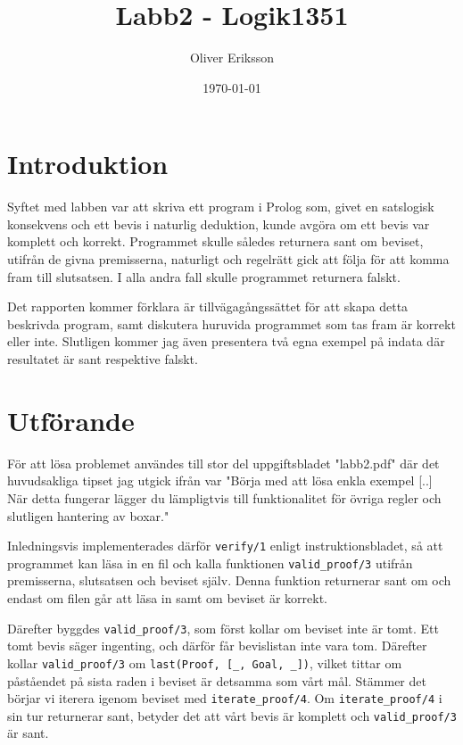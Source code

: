 \documentclass[a4paper]{article}
\title{Labb2 - Logik1351}
\author{Oliver Eriksson}
\date{\today}
\begin{document}
\maketitle
\newpage
\tableofcontents
\newpage

\section{Introduktion}
\label{sec:introduction}

Syftet med labben var att skriva ett program i Prolog som, givet en satslogisk konsekvens och ett bevis i naturlig deduktion, kunde avgöra om ett bevis var komplett och korrekt. Programmet skulle således returnera sant om beviset, utifrån de givna premisserna, naturligt och regelrätt gick att följa för att komma fram till slutsatsen. I alla andra fall skulle programmet returnera falskt.

Det rapporten kommer förklara är tillvägagångssättet för att skapa detta beskrivda program, samt diskutera huruvida programmet som tas fram är korrekt eller inte. Slutligen kommer jag även presentera två egna exempel på indata där resultatet är sant respektive falskt.

\section{Utförande}
För att lösa problemet användes till stor del uppgiftsbladet "labb2.pdf" där det huvudsakliga tipset jag utgick ifrån var "Börja med att lösa enkla exempel [..] När detta fungerar lägger du lämpligtvis till funktionalitet för övriga regler och slutligen hantering av boxar."

Inledningsvis implementerades därför \texttt{verify/1} enligt instruktionsbladet, så att programmet kan läsa in en fil och kalla funktionen \texttt{valid_proof/3} utifrån premisserna, slutsatsen och beviset själv. Denna funktion returnerar sant om och endast om filen går att läsa in samt om beviset är korrekt.

Därefter byggdes \texttt{valid_proof/3}, som först kollar om beviset inte är tomt. Ett tomt bevis säger ingenting, och därför får bevislistan inte vara tom. Därefter kollar \texttt{valid_proof/3} om \texttt{last(Proof, [_, Goal, _])}, vilket tittar om påståendet på sista raden i beviset är detsamma som vårt mål. Stämmer det börjar vi iterera igenom beviset med \texttt{iterate_proof/4}. Om \texttt{iterate_proof/4} i sin tur returnerar sant, betyder det att vårt bevis är komplett och \texttt{valid_proof/3} är sant.
\end{document}
